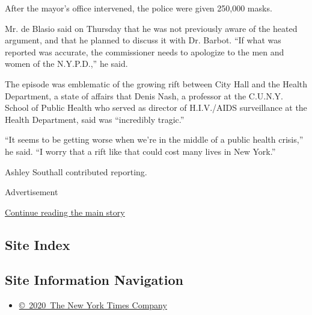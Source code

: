 After the mayor's office intervened, the police were given 250,000
masks.

Mr. de Blasio said on Thursday that he was not previously aware of the
heated argument, and that he planned to discuss it with Dr. Barbot. ``If
what was reported was accurate, the commissioner needs to apologize to
the men and women of the N.Y.P.D.,'' he said.

The episode was emblematic of the growing rift between City Hall and the
Health Department, a state of affairs that Denis Nash, a professor at
the C.U.N.Y. School of Public Health who served as director of
H.I.V./AIDS surveillance at the Health Department, said was ``incredibly
tragic.''

``It seems to be getting worse when we're in the middle of a public
health crisis,'' he said. ``I worry that a rift like that could cost
many lives in New York.''

Ashley Southall contributed reporting.

Advertisement

\protect\hyperlink{after-bottom}{Continue reading the main story}

\hypertarget{site-index}{%
\subsection{Site Index}\label{site-index}}

\hypertarget{site-information-navigation}{%
\subsection{Site Information
Navigation}\label{site-information-navigation}}

\begin{itemize}
\tightlist
\item
  \href{https://help.nytimes.com/hc/en-us/articles/115014792127-Copyright-notice}{©~2020~The
  New York Times Company}
\end{itemize}

